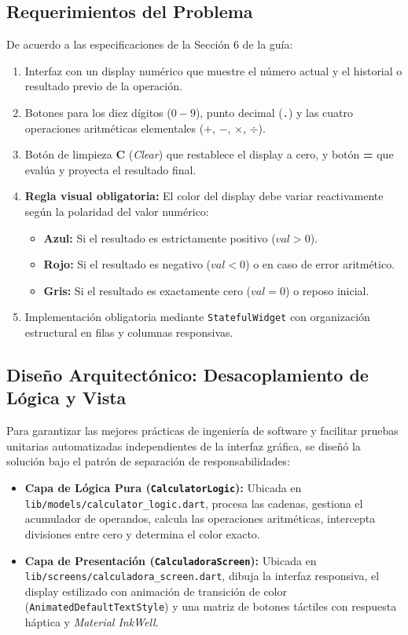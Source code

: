 \documentclass[12pt,a4paper]{article}
\begin{document}
\subsection{Requerimientos del Problema}
De acuerdo a las especificaciones de la Sección 6 de la guía:
\begin{enumerate}[noitemsep]
    \item Interfaz con un display numérico que muestre el número actual y el historial o resultado previo de la operación.
    \item Botones para los diez dígitos ($0 - 9$), punto decimal (\texttt{.}) y las cuatro operaciones aritméticas elementales ($+$, $-$, $\times$, $\div$).
    \item Botón de limpieza \textbf{C} (\textit{Clear}) que restablece el display a cero, y botón \textbf{=} que evalúa y proyecta el resultado final.
    \item \textbf{Regla visual obligatoria:} El color del display debe variar reactivamente según la polaridad del valor numérico:
    \begin{itemize}[noitemsep]
        \item \textbf{Azul:} Si el resultado es estrictamente positivo ($val > 0$).
        \item \textbf{Rojo:} Si el resultado es negativo ($val < 0$) o en caso de error aritmético.
        \item \textbf{Gris:} Si el resultado es exactamente cero ($val = 0$) o reposo inicial.
    \end{itemize}
    \item Implementación obligatoria mediante \texttt{StatefulWidget} con organización estructural en filas y columnas responsivas.
\end{enumerate}

\subsection{Diseño Arquitectónico: Desacoplamiento de Lógica y Vista}
Para garantizar las mejores prácticas de ingeniería de software y facilitar pruebas unitarias automatizadas independientes de la interfaz gráfica, se diseñó la solución bajo el patrón de separación de responsabilidades:
\begin{itemize}
    \item \textbf{Capa de Lógica Pura (\texttt{CalculatorLogic}):} Ubicada en \texttt{lib/models/calculator\_logic.dart}, procesa las cadenas, gestiona el acumulador de operandos, calcula las operaciones aritméticas, intercepta divisiones entre cero y determina el color exacto.
    \item \textbf{Capa de Presentación (\texttt{CalculadoraScreen}):} Ubicada en \texttt{lib/screens/calculadora\_screen.dart}, dibuja la interfaz responsiva, el display estilizado con animación de transición de color (\texttt{AnimatedDefaultTextStyle}) y una matriz de botones táctiles con respuesta háptica y \textit{Material InkWell}.
\end{itemize}
\end{document}
